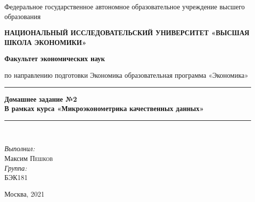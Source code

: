 \documentclass[a4paper,12pt]{article}
\date{\today}
\begin{document}
	
	\begin{titlepage}
		\newpage
		
		\begin{center}
			\large{Федеральное государственное автономное образовательное учреждение высшего образования} \\
		\end{center}
		
		\begin{center}
			\large \textbf{НАЦИОНАЛЬНЫЙ ИССЛЕДОВАТЕЛЬСКИЙ УНИВЕРСИТЕТ
				«ВЫСШАЯ ШКОЛА ЭКОНОМИКИ»
			} \\
		\end{center}
		
		\vspace{1em}
		
		\begin{center}
			\Large \textbf{Факультет экономических наук} \\
		\end{center}
		\begin{center}
			\large {по направлению подготовки Экономика} \linebreak \large {образовательная программа «Экономика»}
			
		\end{center}
		
		\vspace{2em}
		
		\vspace{0.5em}
		\rule{\linewidth}{0.3mm}
		\begin{center}
			\huge \textbf{Домашнее задание №2} \\[0.4cm]
			\LARGE \textbf{В рамках курса
				«Микроэконометрика качественных данных»
}
		\end{center}
		\rule{\linewidth}{0.3mm} \\[0.4cm]
		
		\vspace{18em}
		\begin{flushright}
			\large
			\textit{Выполнил:}\\
			Максим \textsc{Пешков} \\
			\textit{Группа:}\\
			БЭК181
		\end{flushright}
		
		\vspace{5em}
		
		\begin{center}
			Москва, 2021
		\end{center}
		
	\end{titlepage}
	
\end{document}
